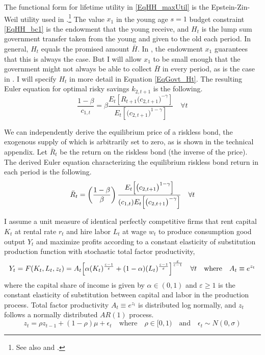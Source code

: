 \documentclass[letterpaper,12pt]{article}
\theoremstyle{definition}
\newcommand\ve{\varepsilon}
\begin{document}
  The functional form for lifetime utility in \eqref{EqHH_maxUtil} is the Epstein-Zin-Weil utility used in \citet{Blanchard:2019}.\footnote{See also \citet{EpsteinZin:2013} and \citet{Weil:1990}.} The value $x_1$ in the young age $s=1$ budget constraint \eqref{EqHH_bc1} is the endowment that the young receive, and $H_t$ is the lump sum government transfer taken from the young and given to the old each period. In general, $H_t$ equals the promised amount $\bar{H}$. In \citet{Blanchard:2019}, the endowment $x_1$ guarantees that this is always the case. But I will allow $x_1$ to be small enough that the government might not always be able to collect $\bar{H}$ in every period, as is the case in \citet{EvansEtAl:2013}. I will specify $H_t$ in more detail in Equation \eqref{EqGovt_Ht}. The resulting Euler equation for optimal risky savings $k_{2,t+1}$ is the following.
  \begin{equation}\label{EqHH_Eul_c1}
    \frac{1-\beta}{c_{1,t}} = \beta \frac{E_t\left[R_{t+1}\bigl(c_{2,t+1}\bigr)^{-\gamma}\right]}{E_t\left[\bigl(c_{2,t+1}\bigr)^{1-\gamma}\right]} \quad\forall t
  \end{equation}

  We can independently derive the equilibrium price of a riskless bond, the exogenous supply of which is arbitrarily set to zero, as is shown in the technical appendix. Let $\bar{R}_t$ be the return on the riskless bond (the inverse of the price). The derived Euler equation characterizing the equilibrium riskless bond return in each period is the following.
  \begin{equation}\label{EqHH_Eul_Rbar}
    \bar{R}_t = \left(\frac{1-\beta}{\beta}\right)\frac{E_t\Bigl[\bigl(c_{2,t+1}\bigr)^{1-\gamma}\Bigr]}{(c_{1,t})E_t\Bigl[\bigl(c_{2,t+1}\bigr)^{-\gamma}\Bigr]}\quad\forall t
  \end{equation}

  I assume a unit measure of identical perfectly competitive firms that rent capital $K_t$ at rental rate $r_t$ and hire labor $L_t$ at wage $w_t$ to produce consumption good output $Y_t$ and maximize profits according to a constant elasticity of substitution production function with stochastic total factor productivity,
  \begin{equation}\label{EqFirm_ProdFunc}
    Y_t = F(K_t, L_t, z_t) = A_t\Bigl[\alpha(K_t)^\frac{\ve-1}{\ve} + (1 - \alpha)(L_t)^\frac{\ve-1}{\ve}\Bigr]^\frac{\ve}{\ve-1} \quad\forall t \quad\text{where}\quad A_t\equiv e^{z_t}
  \end{equation}
  where the capital share of income is given by $\alpha\in(0,1)$ and $\ve\geq 1$ is the constant elasticity of substitution between capital and labor in the production process. Total factor productivity $A_t\equiv e^{z_t}$ is distributed log normally, and $z_t$ follows a normally distributed $AR(1)$ process.
  \begin{equation}\label{EqFirm_ZAR1}
    z_t = \rho z_{t-1} + (1-\rho)\mu + \epsilon_t\quad \text{where}\quad \rho\in[0,1) \quad\text{and}\quad \epsilon_t \sim N(0,\sigma)
  \end{equation}
\end{document}
